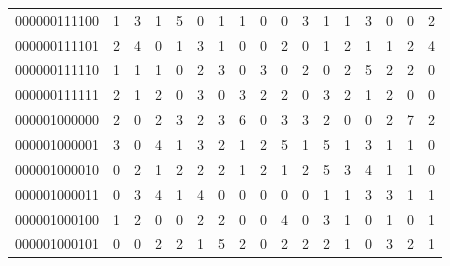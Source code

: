 \documentclass[10pt,a4paper]{article}
\begin{document}
\begin{longtable}{ |c|c|c|c|c|c|c|c|c|c|c|c|c|c|c|c|c| }
    000000111100              & 1                            & 3                                & 1                            & 5                              & 0   & 1   & 1   & 0   & 0   & 3   & 1   & 1   & 3   & 0   & 0   & 2   \\
    000000111101              & 2                            & 4                                & 0                            & 1                              & 3   & 1   & 0   & 0   & 2   & 0   & 1   & 2   & 1   & 1   & 2   & 4   \\
    000000111110              & 1                            & 1                                & 1                            & 0                              & 2   & 3   & 0   & 3   & 0   & 2   & 0   & 2   & 5   & 2   & 2   & 0   \\
    000000111111              & 2                            & 1                                & 2                            & 0                              & 3   & 0   & 3   & 2   & 2   & 0   & 3   & 2   & 1   & 2   & 0   & 0   \\
    000001000000              & 2                            & 0                                & 2                            & 3                              & 2   & 3   & 6   & 0   & 3   & 3   & 2   & 0   & 0   & 2   & 7   & 2   \\
    000001000001              & 3                            & 0                                & 4                            & 1                              & 3   & 2   & 1   & 2   & 5   & 1   & 5   & 1   & 3   & 1   & 1   & 0   \\
    000001000010              & 0                            & 2                                & 1                            & 2                              & 2   & 2   & 1   & 2   & 1   & 2   & 5   & 3   & 4   & 1   & 1   & 0   \\
    000001000011              & 0                            & 3                                & 4                            & 1                              & 4   & 0   & 0   & 0   & 0   & 0   & 1   & 1   & 3   & 3   & 1   & 1   \\
    000001000100              & 1                            & 2                                & 0                            & 0                              & 2   & 2   & 0   & 0   & 4   & 0   & 3   & 1   & 0   & 1   & 0   & 1   \\
    000001000101              & 0                            & 0                                & 2                            & 2                              & 1   & 5   & 2   & 0   & 2   & 2   & 2   & 1   & 0   & 3   & 2   & 1   \\

\end{longtable}
\end{document}
